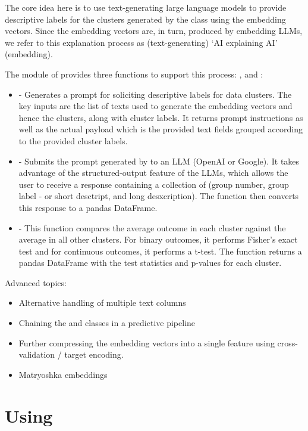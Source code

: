 \documentclass[article]{jss}
\begin{document}
The core idea here is to use text-generating large language models to provide descriptive labels for the clusters generated by the  class using the embedding vectors. Since the embedding vectors are, in turn, produced by embedding LLMs, we refer to this explanation process as (text-generating) `AI explaining AI' (embedding).

The  module of  provides three functions to support this process: ,  and :
\begin{itemize}
  \item \textbf{} - Generates a prompt for soliciting descriptive labels for data clusters. The key inputs are the list of texts used to generate the embedding vectors and hence the clusters, along with cluster labels. It returns prompt instructions as well as the actual payload which is the provided text fields grouped according to the provided cluster labels.
  \item \textbf{} - Submits the prompt generated by  to an LLM (OpenAI or Google). It takes advantage of the structured-output feature of the LLMs, which allows the user to receive a response containing a collection of (group number, group label - or short desctript, and long desxcription). The function then converts this response to a pandas DataFrame.
  \item \textbf{} - This function compares the average outcome in each cluster against the average in all other clusters. For binary outcomes, it performs Fisher's exact test and for continuous outcomes, it performs a t-test. The function returns a pandas DataFrame with the test statistics and p-values for each cluster.
\end{itemize}

Advanced topics:
\begin{itemize}
  \item Alternative handling of multiple text columns
  \item Chaining the  and  classes in a predictive pipeline
  \item Further compressing the embedding vectors into a single feature using cross-validation / target encoding.
  \item Matryoshka embeddings
\end{itemize}

\section[Using TabuLLM]{Using }\label{sec:usage}
\end{document}
